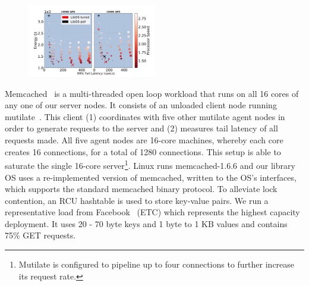 \begin{figure}
\includegraphics[width=0.5\textwidth]{figures/mcd_overview2}
\caption[]{}
\label{fig:mcd_overview2}
\end{figure}





Memcached~\cite{mcd} is a multi-threaded open loop workload that runs on all 16 cores of any one of our server nodes. It consists of an unloaded client node running mutilate~\cite{mutilate}. This client (1) coordinates with five other mutilate agent nodes in order to generate requests to the server and (2) measures tail latency of all requests made. All five agent nodes are 16-core machines, whereby each core creates 16 connections, for a total of 1280 connections. This setup is able to saturate the single 16-core server\footnote{Mutilate is configured to pipeline up to four connections to further increase its request rate.}. Linux runs memcached-1.6.6 and our library OS uses a re-implemented version of memcached, written to the OS's interfaces, which supports the standard memcached binary protocol. To alleviate lock contention, an RCU hashtable is used to store key-value pairs. We run a representative load from Facebook~\cite{workloadanalysisfacebook} (ETC) which represents the highest capacity deployment. It uses 20 - 70 byte keys and 1 byte to 1 KB values and contains 75\% GET requests.

